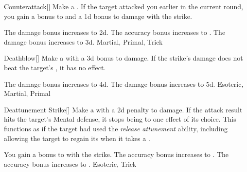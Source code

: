 \lowercase{\hypertarget{maneuver:Counterattack}{}}\label{maneuver:Counterattack}
\hypertarget{maneuver:Counterattack}{}
\begin{freeability}[Rank 1]{Counterattack}[]
Make a .
If the target attacked you earlier in the current round, you gain a  bonus to  and a \plus1d bonus to damage with the strike.

\rankline
{} The damage bonus increases to \plus2d.
 The accuracy bonus increases to .
 The damage bonus increases to \plus3d.
 Martial, Primal, Trick
\end{freeability}
\vspace{0.25em}



\lowercase{\hypertarget{maneuver:Deathblow}{}}\label{maneuver:Deathblow}
\hypertarget{maneuver:Deathblow}{}
\begin{freeability}[Rank 4]{Deathblow}[]
Make a  with a \plus3d bonus to damage.
If the strike's damage does not beat the target's , it has no effect.

\rankline
{} The damage bonus increases to \plus4d.
 The damage bonus increases to \plus5d.
 Esoteric, Martial, Primal
\end{freeability}
\vspace{0.25em}



\lowercase{\hypertarget{maneuver:Deattunement Strike}{}}\label{maneuver:Deattunement Strike}
\hypertarget{maneuver:Deattunement Strike}{}
\begin{freeability}[Rank 1]{Deattunement Strike}[]
Make a  with a \minus2d penalty to damage.
If the attack result hits the target's Mental defense,
it stops being  to one effect of its choice.
This functions as if the target had used the \textit{release attunement} ability,
including allowing the target to regain its  when it takes a .

\rankline
{} You gain a  bonus to  with the strike.
 The accuracy bonus increases to .
 The accuracy bonus increases to .
 Esoteric, Trick
\end{freeability}
\vspace{0.25em}



